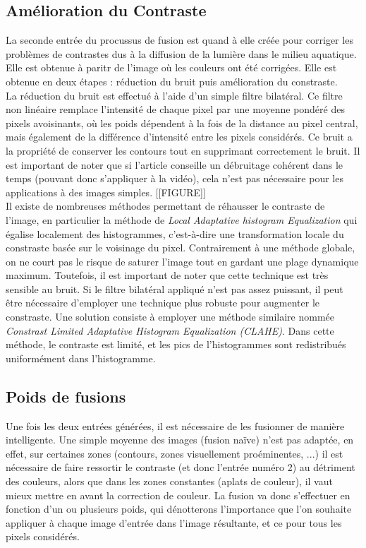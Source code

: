 \documentclass[twoside]{article}
\begin{document}
\begin{multicols}{2}
\subsection{Amélioration du Contraste}
La seconde entrée du procussus de fusion est quand à elle créée pour corriger les problèmes de contrastes dus à la diffusion de la lumière dans le milieu aquatique. Elle est obtenue à paritr de l'image où les couleurs ont été corrigées. Elle est obtenue en deux étapes : réduction du bruit puis amélioration du constraste.\\
La réduction du bruit est effectué à l'aide d'un simple filtre bilatéral. Ce filtre non linéaire remplace l'intensité de chaque pixel par une moyenne pondéré des pixels avoisinants, où les poids dépendent à la fois de la distance au pixel central, mais également de la différence d'intensité entre les pixels considérés. Ce bruit a la propriété de conserver les contours tout en supprimant correctement le bruit. Il est important de noter que si l'article conseille un débruitage cohérent dans le temps (pouvant donc s'appliquer à la vidéo), cela n'est pas nécessaire pour les applications à des images simples. [[FIGURE]]\\
Il existe de nombreuses méthodes permettant de réhausser le contraste de l'image, en particulier la méthode de \emph{Local Adaptative histogram Equalization} qui égalise localement des histogrammes, c'est-à-dire une transformation locale du constraste basée sur le voisinage du pixel. Contrairement à une méthode globale, on ne court pas le risque de saturer l'image tout en gardant une plage dynamique maximum. Toutefois, il est important de noter que cette technique est très sensible au bruit. Si le filtre bilatéral appliqué n'est pas assez puissant, il peut être nécessaire d'employer une technique plus robuste pour augmenter le constraste. Une solution consiste à employer une méthode similaire nommée \emph{Constrast Limited Adaptative Histogram Equalization (CLAHE)}. Dans cette méthode, le contraste est limité, et les pics de l'histogrammes sont redistribués uniformément dans l'histogramme.

\subsection{Poids de fusions}
Une fois les deux entrées générées, il est nécessaire de les fusionner de manière intelligente. Une simple moyenne des images (fusion naïve) n'est pas adaptée, en effet, sur certaines zones (contours, zones visuellement proéminentes, ...) il est nécessaire de faire ressortir le contraste (et donc l'entrée numéro 2) au détriment des couleurs, alors que dans les zones constantes (aplats de couleur), il vaut mieux mettre en avant la correction de couleur. La fusion va donc s'effectuer en fonction d'un ou plusieurs poids, qui dénotterons l'importance que l'on souhaite appliquer à chaque image d'entrée dans l'image résultante, et ce pour tous les pixels considérés. 


\end{multicols}
\end{document}
